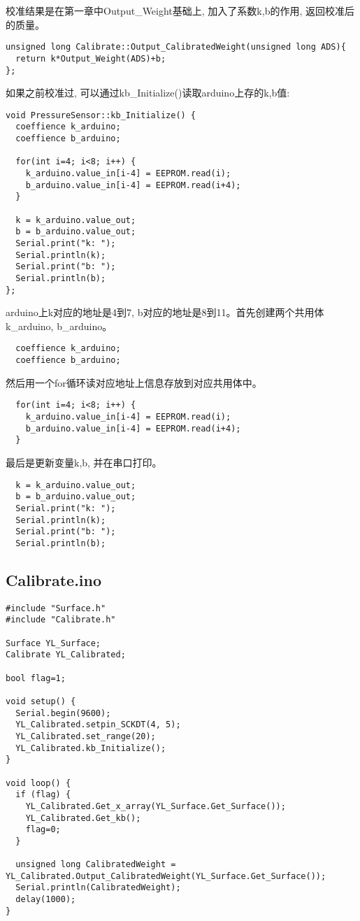 \documentclass{article}
\begin{document}
校准结果是在第一章中Output\_Weight基础上, 加入了系数k,b的作用, 返回校准后的质量。
\begin{lstlisting}
unsigned long Calibrate::Output_CalibratedWeight(unsigned long ADS){
  return k*Output_Weight(ADS)+b;
};
\end{lstlisting}

如果之前校准过, 可以通过kb\_Initialize()读取arduino上存的k,b值:
\begin{lstlisting}
void PressureSensor::kb_Initialize() {
  coeffience k_arduino;
  coeffience b_arduino;
  
  for(int i=4; i<8; i++) {
    k_arduino.value_in[i-4] = EEPROM.read(i);
    b_arduino.value_in[i-4] = EEPROM.read(i+4);
  }

  k = k_arduino.value_out;
  b = b_arduino.value_out;
  Serial.print("k: ");
  Serial.println(k);
  Serial.print("b: ");
  Serial.println(b);
};
\end{lstlisting}

arduino上k对应的地址是4到7, b对应的地址是8到11。首先创建两个共用体k\_arduino, b\_arduino。
\begin{lstlisting}
  coeffience k_arduino;
  coeffience b_arduino; 
\end{lstlisting}

然后用一个for循环读对应地址上信息存放到对应共用体中。
\begin{lstlisting}
  for(int i=4; i<8; i++) {
    k_arduino.value_in[i-4] = EEPROM.read(i);
    b_arduino.value_in[i-4] = EEPROM.read(i+4);
  }  
\end{lstlisting}

最后是更新变量k,b, 并在串口打印。
\begin{lstlisting}
  k = k_arduino.value_out;
  b = b_arduino.value_out;
  Serial.print("k: ");
  Serial.println(k);
  Serial.print("b: ");
  Serial.println(b);
\end{lstlisting}

\subsection{Calibrate.ino}
\begin{lstlisting}
#include "Surface.h"
#include "Calibrate.h"

Surface YL_Surface;
Calibrate YL_Calibrated;

bool flag=1;

void setup() {
  Serial.begin(9600);
  YL_Calibrated.setpin_SCKDT(4, 5);
  YL_Calibrated.set_range(20);
  YL_Calibrated.kb_Initialize();
}

void loop() {
  if (flag) {
    YL_Calibrated.Get_x_array(YL_Surface.Get_Surface());
    YL_Calibrated.Get_kb();
    flag=0;
  }

  unsigned long CalibratedWeight = YL_Calibrated.Output_CalibratedWeight(YL_Surface.Get_Surface());
  Serial.println(CalibratedWeight);
  delay(1000);
}
\end{lstlisting}
\end{document}
